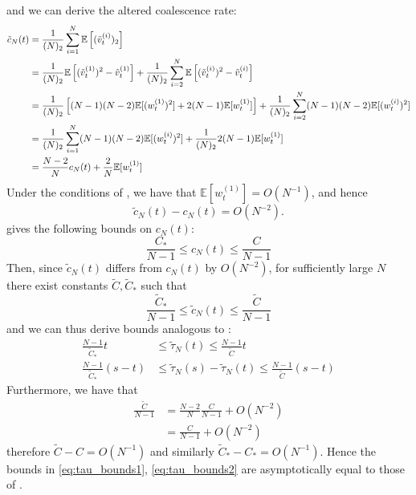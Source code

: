 \documentclass{article}
\newcommand{\E}{\mathbb{E}}
\newcommand{\vttilde}[2][t]{\tilde{v}_{#1}^{(#2)}}
\newcommand{\wt}[2][t]{w_{#1}^{(#2)}}
\begin{document}
and we can derive the altered coalescence rate:
\begin{align}
\tilde{c}_N(t) &= \frac{1}{(N)_2} \sum_{i=1}^{N} \E\left[ (\vttilde{i})_2 \right] \notag\\
&= \frac{1}{(N)_2} \E\left[ (\vttilde{1})^2 - \vttilde{1} \right] + \frac{1}{(N)_2}\sum_{i=2}^{N} \E\left[ (\vttilde{i})^2 - \vttilde{i} \right] \notag\\
&= \frac{1}{(N)_2}\left[ (N-1)(N-2)\E[(\wt{1})^2] + 2(N-1)\E[\wt{1}] \right] + \frac{1}{(N)_2} \sum_{i=2}^{N} (N-1)(N-2)\E[(\wt{i})^2] \notag\\
&= \frac{1}{(N)_2} \sum_{i=1}^{N} (N-1)(N-2)\E[(\wt{i})^2] + \frac{1}{(N)_2} 2(N-1)\E[\wt{1}] \notag\\
&= \frac{N-2}{N} c_N(t) + \frac{2}{N} \E[\wt{1}]
\end{align}
Under the conditions of \citet[Corollary 2]{koskela2018}, we have that $\E[\wt{1}] = O(N^{-1})$, and hence
\begin{equation*}
\tilde{c}_N(t) - c_N(t) = O(N^{-2}).
\end{equation*}
\citet{koskela2018} gives the following bounds on $c_N(t)$:
\begin{equation*}
\frac{C_*}{N-1} \leq c_N(t) \leq \frac{C}{N-1}
\end{equation*}
Then, since $\tilde{c}_N(t)$ differs from $c_N(t)$ by $O(N^{-2})$, for sufficiently large $N$ there exist constants $\tilde{C}, \tilde{C}_*$ such that
\begin{equation*}
\frac{\tilde{C}_*}{N-1} \leq \tilde{c}_N(t) \leq \frac{\tilde{C}}{N-1}
\end{equation*}
and we can thus derive bounds analogous to \citet[(5)-(6)]{koskela2018}:
\begin{align}
\frac{N-1}{\tilde{C}_*}t &\leq \tilde{\tau}_N(t) \leq \frac{N-1}{\tilde{C}}t \label{eq:tau_bounds1}\\
\frac{N-1}{\tilde{C}_*}(s-t) &\leq \tilde{\tau}_N(s) - \tilde{\tau}_N(t) \leq \frac{N-1}{\tilde{C}}(s-t) \label{eq:tau_bounds2}
\end{align}
Furthermore, we have that
\begin{align*}
\frac{\tilde{C}}{N-1} &= \frac{N-2}{N} \frac{C}{N-1} + O(N^{-2}) \\
&= \frac{C}{N-1} + O(N^{-2})
\end{align*}
therefore $\tilde{C} - C = O(N^{-1})$ and similarly $\tilde{C}_* - C_* = O(N^{-1})$. Hence the bounds in \eqref{eq:tau_bounds1}, \eqref{eq:tau_bounds2} are asymptotically equal to those of \citet[(5)--(6)]{koskela2018}.
\end{document}
